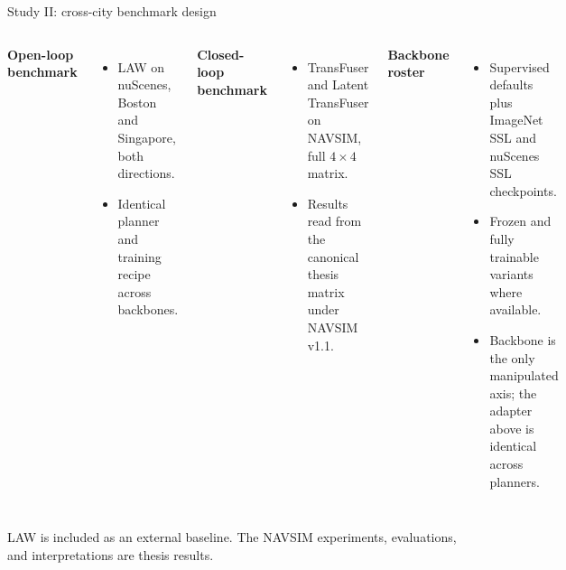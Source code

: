 \documentclass[aspectratio=169, xcolor={table}]{beamer}
\begin{document}
\begin{frame}{Study II: cross-city benchmark design}
  \centering
  \vspace{4pt}
  \begin{columns}[T]
    \textbf{Open-loop benchmark}
    \begin{itemize}\footnotesize
      \item LAW on nuScenes, Boston and Singapore, both directions.
      \item Identical planner and training recipe across backbones.
    \end{itemize}
    \textbf{Closed-loop benchmark}
    \begin{itemize}\footnotesize
      \item TransFuser and Latent TransFuser on NAVSIM, full $4\times4$ matrix.
      \item Results read from the canonical thesis matrix under NAVSIM v1.1.
    \end{itemize}
    \textbf{Backbone roster}
    \begin{itemize}\footnotesize
      \item Supervised defaults plus ImageNet SSL and nuScenes SSL checkpoints.
      \item Frozen and fully trainable variants where available.
      \item Backbone is the only manipulated axis; the adapter above is identical across planners.
    \end{itemize}
  \end{columns}
  \vspace{4pt}
  \footnotesize LAW is included as an external baseline. The NAVSIM experiments, evaluations, and interpretations are thesis results.
\end{frame}
\end{document}
